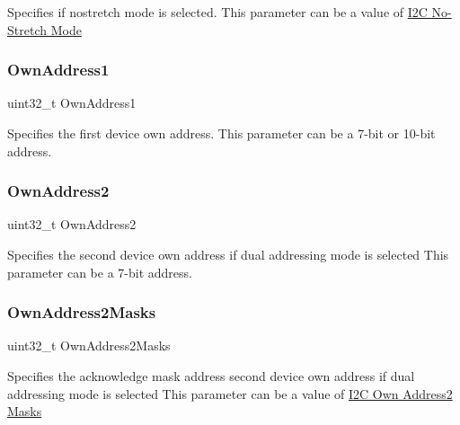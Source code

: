 Specifies if nostretch mode is selected. This parameter can be a value of \hyperlink{group___i2_c___n_o_s_t_r_e_t_c_h___m_o_d_e}{I2C No-\/\+Stretch Mode} \mbox{\label{struct_i2_c___init_type_def_a8abec5c168e27bf11b2808c1450bdeda}} 
\subsubsection{\texorpdfstring{Own\+Address1}{OwnAddress1}}
{\footnotesize\ttfamily uint32\+\_\+t Own\+Address1}

Specifies the first device own address. This parameter can be a 7-\/bit or 10-\/bit address. \mbox{\label{struct_i2_c___init_type_def_a6300c7a7e1b7d5444226a1bd55744f53}} 
\subsubsection{\texorpdfstring{Own\+Address2}{OwnAddress2}}
{\footnotesize\ttfamily uint32\+\_\+t Own\+Address2}

Specifies the second device own address if dual addressing mode is selected This parameter can be a 7-\/bit address. \mbox{\label{struct_i2_c___init_type_def_a4fb48639ef769c55e617e6b97e63a531}} 
\subsubsection{\texorpdfstring{Own\+Address2\+Masks}{OwnAddress2Masks}}
{\footnotesize\ttfamily uint32\+\_\+t Own\+Address2\+Masks}

Specifies the acknowledge mask address second device own address if dual addressing mode is selected This parameter can be a value of \hyperlink{group___i2_c___o_w_n___a_d_d_r_e_s_s2___m_a_s_k_s}{I2C Own Address2 Masks} \mbox{\label{struct_i2_c___init_type_def_acd4afe05c37d7924e50f6795641dbd70}} 
